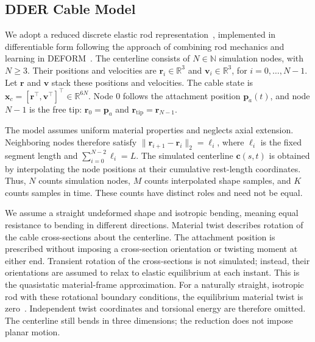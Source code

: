 \documentclass[letterpaper, 10 pt, conference]{ieeeconf}
\begin{document}
\subsection{DDER Cable Model}
\label{subsec:dder_model}

We adopt a reduced discrete elastic rod
representation~\cite{bergou2008discrete}, implemented in
differentiable form following the approach of combining rod
mechanics and learning in DEFORM~\cite{pmlr-v270-chen25d}.
The centerline consists of $N\in\mathbb{N}$ simulation nodes,
with $N\geq3$. Their positions and velocities are
$\mathbf{r}_i\in\mathbb{R}^{3}$ and
$\mathbf{v}_i\in\mathbb{R}^{3}$, for $i=0,\ldots,N-1$.
Let $\mathbf{r}$ and $\mathbf{v}$ stack these positions and
velocities. The cable state is
$\mathbf{x}_c=[\mathbf{r}^{\top},\mathbf{v}^{\top}]^{\top}
\in\mathbb{R}^{6N}$.
Node $0$ follows the attachment position $\mathbf{p}_a(t)$,
and node $N-1$ is the free tip:
$\mathbf{r}_0=\mathbf{p}_a$ and
$\mathbf{r}_{\mathrm{tip}}=\mathbf{r}_{N-1}$.

The model assumes uniform material properties and neglects axial extension.
Neighboring nodes therefore satisfy
$\|\mathbf{r}_{i+1}-\mathbf{r}_i\|_2=\ell_i$,
where $\ell_i$ is the fixed segment length and
$\sum_{i=0}^{N-2}\ell_i=L$.
The simulated centerline $\mathbf{c}(s,t)$ is obtained by
interpolating the node positions at their cumulative rest-length
coordinates. Thus, $N$ counts simulation nodes, $M$ counts
interpolated shape samples, and $K$ counts samples in time.
These counts have distinct roles and need not be equal.

We assume a straight undeformed shape and isotropic bending,
meaning equal resistance to bending in different directions.
Material twist describes rotation of the cable cross-sections
about the centerline.
The attachment position is prescribed without imposing a
cross-section orientation or twisting moment at either end.
Transient rotation of the cross-sections is not simulated;
instead, their orientations are assumed to relax to elastic
equilibrium at each instant. This is the quasistatic
material-frame approximation. For a naturally straight,
isotropic rod with these rotational boundary conditions,
the equilibrium material twist is zero~\cite{bergou2008discrete}.
Independent twist coordinates and torsional energy are therefore
omitted. The centerline still bends in three dimensions;
the reduction does not impose planar motion.
\end{document}
